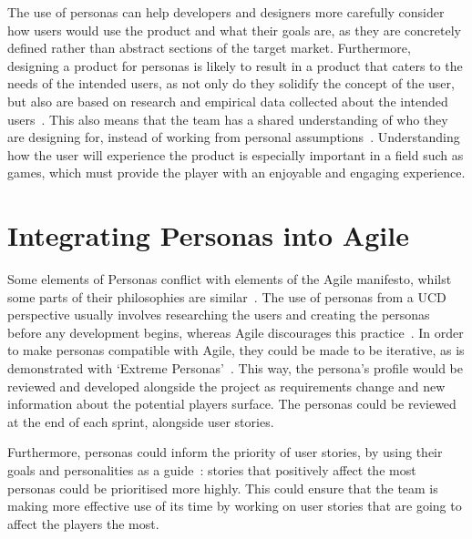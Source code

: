 \documentclass{scrartcl}
\begin{document}
The use of personas can help developers and designers more carefully consider how users would use the product and what their goals are, as they are concretely defined rather than abstract sections of the target market. Furthermore, designing a product for personas is likely to result in a product that caters to the needs of the intended users, as not only do they solidify the concept of the user, but also are based on research and empirical data collected about the intended users~\cite{cooper:face}. This also means that the team has a shared understanding of who they are designing for, instead of working from personal assumptions~\cite{singh:uscrum}. Understanding how the user will experience the product is especially important in a field such as games, which must provide the player with an enjoyable and engaging experience.

\section{Integrating Personas into Agile}
Some elements of Personas conflict with elements of the Agile manifesto, whilst some parts of their philosophies are similar~\cite{haikara:extending, chaimberlain:framework}. The use of personas from a UCD perspective usually involves researching the users and creating the personas before any development begins, whereas Agile discourages this practice~\cite{chaimberlain:framework}. In order to make personas compatible with Agile, they could be made to be iterative, as is demonstrated with `Extreme Personas'~\cite{wolkerstorfer:probing}. This way, the persona's profile would be reviewed and developed alongside the project as requirements change and new information about the potential players surface. The personas could be reviewed at the end of each sprint, alongside user stories. 

Furthermore, personas could inform the priority of user stories, by using their goals and personalities as a guide~\cite{miller:personas}: stories that positively affect the most personas could be prioritised more highly.
This could ensure that the team is making more effective use of its time by working on user stories that are going to affect the players the most.
\end{document}

